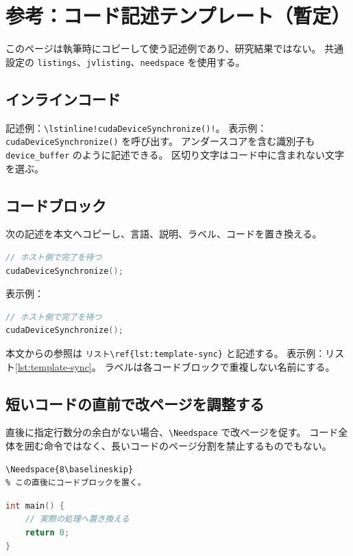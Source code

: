 \documentclass[../main.tex]{subfiles}
\begin{document}
\section*{参考：コード記述テンプレート（暫定）}
このページは執筆時にコピーして使う記述例であり、研究結果ではない。
共通設定の \texttt{listings}、\texttt{jvlisting}、\texttt{needspace} を使用する。

\subsection*{インラインコード}
記述例：\verb|\lstinline!cudaDeviceSynchronize()!|。
表示例：\lstinline!cudaDeviceSynchronize()! を呼び出す。
アンダースコアを含む識別子も \lstinline!device_buffer! のように記述できる。
区切り文字はコード中に含まれない文字を選ぶ。

\subsection*{コードブロック}
次の記述を本文へコピーし、言語、説明、ラベル、コードを置き換える。

\begin{latexexample}
\begin{lstlisting}[language=C++,caption={同期処理の例},label={lst:sync-example}]
// ホスト側で完了を待つ
cudaDeviceSynchronize();
\end{lstlisting}
\end{latexexample}

表示例：
\begin{lstlisting}[language=C++,caption={同期処理の例（テンプレート）},label={lst:template-sync}]
// ホスト側で完了を待つ
cudaDeviceSynchronize();
\end{lstlisting}
本文からの参照は \verb|リスト\ref{lst:template-sync}| と記述する。
表示例：リスト\ref{lst:template-sync}。
ラベルは各コードブロックで重複しない名前にする。

\subsection*{短いコードの直前で改ページを調整する}
直後に指定行数分の余白がない場合、\verb|\Needspace| で改ページを促す。
コード全体を囲む命令ではなく、長いコードのページ分割を禁止するものでもない。

\begin{lstlisting}[language={[LaTeX]TeX},numbers=none]
\Needspace{8\baselineskip}
% この直後にコードブロックを置く。
\end{lstlisting}

\begin{lstlisting}[language=C++,caption={短いコードの例（テンプレート）},label={lst:template-short}]
int main() {
    // 実際の処理へ置き換える
    return 0;
}
\end{lstlisting}
\end{document}
